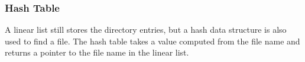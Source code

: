 \subsubsection{Hash Table}\label{subsubsec:Hash_Table_Directory}
A linear list still stores the directory entries, but a hash data structure is also used to find a file.
The hash table takes a value computed from the file name and returns a pointer to the file name in the linear list.

